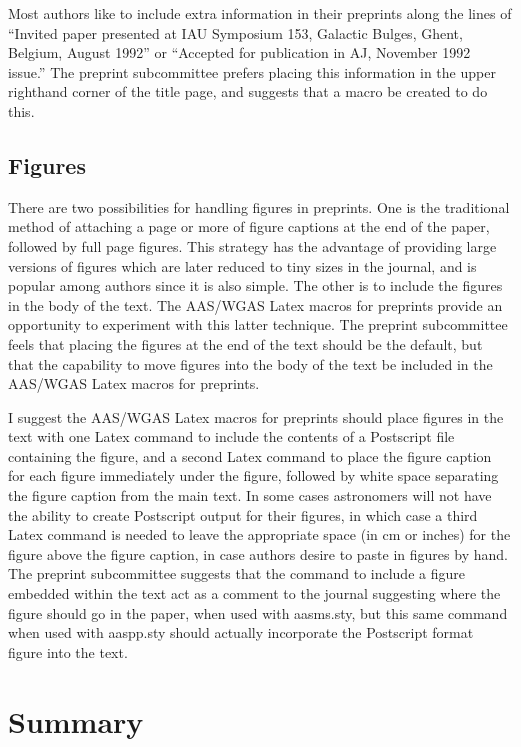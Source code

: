 Most authors like to include extra information in their preprints along the 
lines of ``Invited paper presented at IAU Symposium 153, Galactic Bulges,
Ghent, Belgium, August 1992'' or ``Accepted for publication in AJ, November 
1992 issue.''  The preprint subcommittee prefers placing this information 
in the upper righthand corner of the title page, and suggests that a macro 
be created to do this.

\subsection
{Figures}

There are two possibilities for handling figures in preprints.  One is the 
traditional method of attaching a page or more of figure captions at the 
end of the paper, followed by full page figures.  This strategy has the 
advantage of providing large versions of figures which are later reduced 
to tiny sizes in the journal, and is popular among authors since it is 
also simple.  The other is to include the figures in the body of the text.
The AAS/WGAS Latex macros for preprints provide an opportunity to experiment 
with this latter technique.  The preprint subcommittee feels that placing 
the figures at the end of the text should be the default, but that the 
capability to move figures into the body of the text be included in the
AAS/WGAS Latex macros for preprints.

I suggest the AAS/WGAS Latex macros for preprints should place figures
in the text with one Latex command to include the contents of a Postscript 
file containing the figure, and a second Latex command to place the figure 
caption for each figure immediately under the figure, followed by white 
space separating the figure caption from the main text.  In some cases 
astronomers will not have the ability to create Postscript output for their 
figures, in which case a third Latex command is needed to leave the 
appropriate space (in cm or inches) for the figure above the figure caption,
in case authors desire to paste in figures by hand.  The preprint subcommittee 
suggests that the command to include a figure embedded within the text act 
as a comment to the journal suggesting where the figure should go in the 
paper, when used with aasms.sty, but this same command when used with 
aaspp.sty should actually incorporate the Postscript format figure into 
the text.

\section
{Summary}


